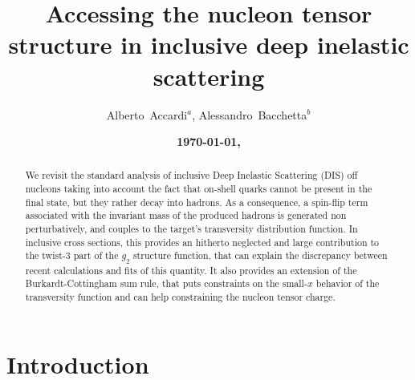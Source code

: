 \documentclass[preprintnumbers,floatfix,nofootinbib]{revtex4}
\begin{document}


\title{Accessing the nucleon tensor structure in inclusive deep inelastic scattering} 

\author{Alberto~Accardi$^{a}$, Alessandro~Bacchetta$^{b}$} 

\date{\bf \today, \currenttime}

\begin{abstract}
We revisit the standard analysis of inclusive Deep Inelastic Scattering (DIS)
off nucleons taking into
account the fact that on-shell quarks cannot be present in the final state,
but they rather decay into hadrons. As a consequence, a spin-flip term
associated with the invariant mass of the produced hadrons is generated
non perturbatively, and couples to the target's transversity distribution
function. In inclusive cross sections, this provides an hitherto neglected and
large contribution to the twist-3 part of the $g_2$ structure function, that
can explain the discrepancy between recent calculations and fits of this
quantity. It also provides an extension of the Burkardt-Cottingham sum rule,
that puts constraints on the small-$x$ behavior of the transversity
function and can help constraining the nucleon tensor charge.
\end{abstract}



\maketitle


\section{Introduction}
\end{document}
